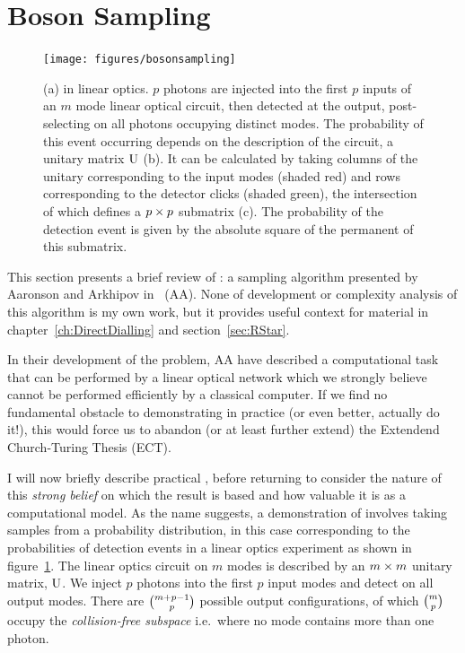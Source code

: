 \section{Boson Sampling}
\label{sec:BosonSampling}
\begin{figure}
  \texttt{[image: figures/bosonsampling]}
  \caption[BosonSampling in linear optics]
  {(a) \bosonsampling{} in linear optics. \(p\) photons are injected into the
  first \(p\) inputs of an \(m\) mode linear optical circuit, then detected at
  the output, post-selecting on all photons occupying distinct modes. The
  probability of this event occurring depends on the description of the circuit,
  a unitary matrix \(\mathrm{U}\) (b). It can be calculated by taking columns of
  the unitary corresponding to the input modes (shaded red) and rows
  corresponding to the detector clicks (shaded green), the intersection of which
  defines a \(p \times p\) submatrix (c). The probability of the detection event is
  given by the absolute square of the permanent of this submatrix.}
  \label{fig:BosonSampling}
\end{figure}
This section presents a brief review of \bosonsampling{}: a sampling algorithm
presented by Aaronson and Arkhipov in~\cite{bosonsampling} (AA). None of
development or complexity analysis of this algorithm is my own work, but it
provides useful context for material in chapter~\ref{ch:DirectDialling} and
section~\ref{sec:RStar}.

In their development of the \bosonsampling{} problem, AA have described a
computational task that can be performed by a linear optical network which we
strongly believe cannot be performed efficiently by a classical computer. If we
find no
fundamental obstacle to demonstrating \bosonsampling{} in practice (or even
better, actually do it!), this would force us to abandon (or at least further
extend) the Extendend Church-Turing Thesis (ECT).

I will now briefly describe practical \bosonsampling{}, before returning to
consider the nature of this \emph{strong belief} on which the result is based
and how valuable it is as a computational model. As the name suggests, a
demonstration of \bosonsampling{} involves taking samples from a probability
distribution, in this case corresponding to the probabilities of detection
events in a linear optics experiment as shown in figure~\ref{fig:BosonSampling}.
The linear optics circuit on \(m\) modes is described by an \(m \times m\) unitary
matrix, \(\mathrm{U}\). We inject \(p\) photons into the first \(p\) input modes
and detect on all output modes. There are \({m+p-1}\choose{p}\) possible output
configurations, of which \({m}\choose{p}\) occupy the \emph{collision-free
subspace} i.e.\ where no mode contains more than one photon.

